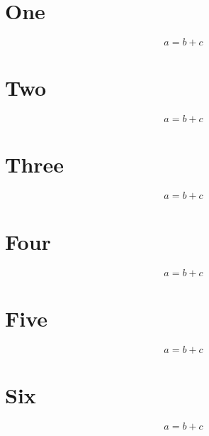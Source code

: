 \documentclass{article}
\begin{document}
\section{One}
\begin{equation} a=b+c\end{equation}

\section{Two}
\begin{equation} a=b+c\end{equation}

\section{Three}
\begin{equation} a=b+c\end{equation}


\section{Four}
\begin{equation} a=b+c\end{equation}

\section{Five}
\begin{equation} a=b+c\end{equation}


\makeatletter
{}
\makeatother
\section{Six}
\begin{equation} a=b+c\end{equation}
\end{document}

